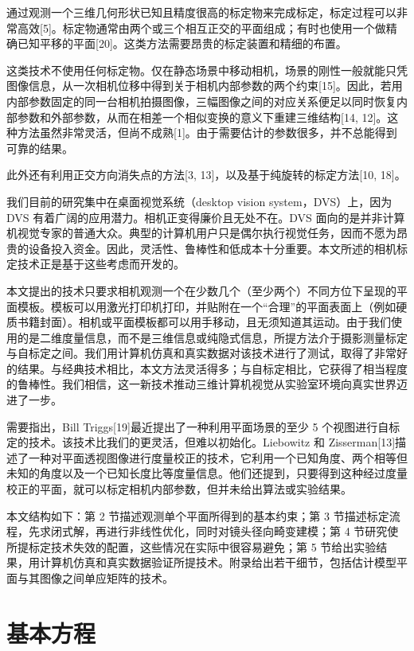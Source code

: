 \documentclass[a4paper,twocolumn,zihao=5,fontset=none,UTF8]{ctexart}
\begin{document}
通过观测一个三维几何形状已知且精度很高的标定物来完成标定，标定过程可以非常高效[5]。标定物通常由两个或三个相互正交的平面组成；有时也使用一个做精确已知平移的平面[20]。这类方法需要昂贵的标定装置和精细的布置。

这类技术不使用任何标定物。仅在静态场景中移动相机，场景的刚性一般就能只凭图像信息，从一次相机位移中得到关于相机内部参数的两个约束[15]。因此，若用内部参数固定的同一台相机拍摄图像，三幅图像之间的对应关系便足以同时恢复内部参数和外部参数，从而在相差一个相似变换的意义下重建三维结构[14, 12]。这种方法虽然非常灵活，但尚不成熟[1]。由于需要估计的参数很多，并不总能得到可靠的结果。

此外还有利用正交方向消失点的方法[3, 13]，以及基于纯旋转的标定方法[10, 18]。

我们目前的研究集中在桌面视觉系统（desktop vision system，DVS）上，因为 DVS 有着广阔的应用潜力。相机正变得廉价且无处不在。DVS 面向的是并非计算机视觉专家的普通大众。典型的计算机用户只是偶尔执行视觉任务，因而不愿为昂贵的设备投入资金。因此，灵活性、鲁棒性和低成本十分重要。本文所述的相机标定技术正是基于这些考虑而开发的。

本文提出的技术只要求相机观测一个在少数几个（至少两个）不同方位下呈现的平面模板。模板可以用激光打印机打印，并贴附在一个“合理”的平面表面上（例如硬质书籍封面）。相机或平面模板都可以用手移动，且无须知道其运动。由于我们使用的是二维度量信息，而不是三维信息或纯隐式信息，所提方法介于摄影测量标定与自标定之间。我们用计算机仿真和真实数据对该技术进行了测试，取得了非常好的结果。与经典技术相比，本文方法灵活得多；与自标定相比，它获得了相当程度的鲁棒性。我们相信，这一新技术推动三维计算机视觉从实验室环境向真实世界迈进了一步。

需要指出，Bill Triggs[19]最近提出了一种利用平面场景的至少 5 个视图进行自标定的技术。该技术比我们的更灵活，但难以初始化。Liebowitz 和 Zisserman[13]描述了一种对平面透视图像进行度量校正的技术，它利用一个已知角度、两个相等但未知的角度以及一个已知长度比等度量信息。他们还提到，只要得到这种经过度量校正的平面，就可以标定相机内部参数，但并未给出算法或实验结果。

本文结构如下：第 2 节描述观测单个平面所得到的基本约束；第 3 节描述标定流程，先求闭式解，再进行非线性优化，同时对镜头径向畸变建模；第 4 节研究使所提标定技术失效的配置，这些情况在实际中很容易避免；第 5 节给出实验结果，用计算机仿真和真实数据验证所提技术。附录给出若干细节，包括估计模型平面与其图像之间单应矩阵的技术。

\section{基本方程}
\end{document}

